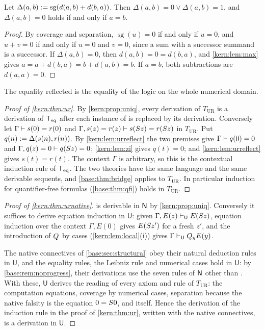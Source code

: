 \begin{lemma}
\label{kern:lem:urreflect}
Let $\Delta(a,b)\mathrel{:=}\operatorname{sg}(d(a,b)+d(b,a))$.  Then
$\Delta(a,b)=0\vee\Delta(a,b)=1$, and $\Delta(a,b)=0$ holds if and only if
$a=b$.
\end{lemma}

\begin{proof}
By coverage and separation, $\operatorname{sg}(u)=0$ if and only if $u=0$,
and $u+v=0$ if and only if $u=0$ and $v=0$, since a sum with a successor
summand is a successor.  If $\Delta(a,b)=0$, then $d(a,b)=0=d(b,a)$, and
\cref{kern:lem:max} gives $a=a+d(b,a)=b+d(a,b)=b$.  If $a=b$, both
subtractions are $d(a,a)=0$.
\end{proof}

The equality reflected is the equality of the logic on the whole numerical
domain.

\begin{proof}[Proof of \cref{kern:thm:ur}]
By \cref{kern:prop:uniq}, every derivation of $T_{\mathrm{UR}}$ is a
derivation of $\mathsf{T}_{\mathrm{eq}}$ after each instance of  is replaced by its
derivation.  Conversely let $\Gamma\vdash s(0)=r(0)$ and
$\Gamma,s(z)=r(z)\vdash s(S z)=r(S z)$ in $T_{\mathrm{UR}}$.  Put
$q(n)\mathrel{:=}\Delta(s(n),r(n))$.  By \cref{kern:lem:urreflect} the two
premises give $\Gamma\vdash q(0)=0$ and
$\Gamma,q(z)=0\vdash q(S z)=0$; \cref{kern:lem:zi} gives $q(t)=0$; and
\cref{kern:lem:urreflect} gives $s(t)=r(t)$.  The context $\Gamma$ is
arbitrary, so this is the contextual induction rule of $\mathsf{T}_{\mathrm{eq}}$.  The two
theories have the same language and the same derivable sequents, and
\cref{base:thm:bridge} applies to $T_{\mathrm{UR}}$.  In particular
induction for quantifier-free formulas (\cref{base:thm:qfi}) holds in
$T_{\mathrm{UR}}$.
\end{proof}

\begin{proof}[Proof of \cref{kern:thm:urnative}]
 is derivable in $\mathsf{N}$ by \cref{kern:prop:uniq}.  Conversely
it suffices to derive equation induction in $\mathsf{U}$: given
$\Gamma,E(z)\vdash_{\mathsf{U}}E(S z)$, equation induction over the
context $\Gamma,E(0)$ gives $E(S z')$ for a fresh $z'$, and the
introduction of $Q_{}$ by cases (\cref{kern:lem:local}(i)) gives
$\Gamma\vdash_{\mathsf{U}}Q_{y}E(y)$.

The native connectives of \cref{base:sec:structural} obey their natural
deduction rules in $\mathsf{U}$, and the equality rules, the Leibniz rule
and numerical cases hold in $\mathsf{U}$: by \cref{base:rem:noprogress},
their derivations use the seven rules of $\mathsf{N}$ other than .
With these, $\mathsf{U}$ derives the reading of every axiom and rule of
$T_{\mathrm{UR}}$: the computation equations,
coverage by numerical cases, separation because the native falsity is the
equation $0=S 0$, and  itself.  Hence the derivation of the
induction rule in the proof of \cref{kern:thm:ur}, written with the native
connectives, is a derivation in $\mathsf{U}$.
\end{proof}

